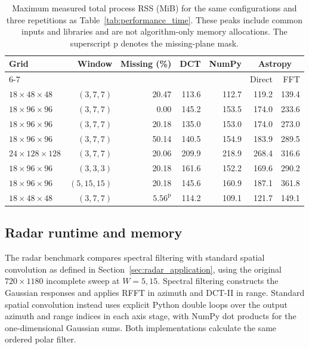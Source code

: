 \documentclass[a4paper,fleqn]{cas-sc}
\begin{document}
\begin{table}[pos=htbp]
	\centering
	\caption{Maximum measured total process RSS (MiB) for the same configurations and three repetitions as Table~\ref{tab:performance_time}. These peaks include common inputs and libraries and are not algorithm-only memory allocations. The superscript p denotes the missing-plane mask.}
	\label{tab:performance_ram}
	\setlength{\tabcolsep}{4pt}
	\begin{tabular*}{\linewidth}{@{\extracolsep{\fill}}lrrrrrr@{}}
		\toprule
		Grid & Window & Missing (\%) & DCT & NumPy & \multicolumn{2}{c}{Astropy} \\
		\cmidrule(l){6-7}
		 & & & & & Direct & FFT \\
		\midrule
		$18\times48\times48$ & $(3,7,7)$ & 20.47 & 113.6 & 112.7 & 119.2 & 139.4 \\
		$18\times96\times96$ & $(3,7,7)$ & 0.00 & 145.2 & 153.5 & 174.0 & 233.6 \\
		$18\times96\times96$ & $(3,7,7)$ & 20.18 & 135.0 & 153.0 & 174.0 & 273.0 \\
		$18\times96\times96$ & $(3,7,7)$ & 50.14 & 140.5 & 154.9 & 183.9 & 289.5 \\
		$24\times128\times128$ & $(3,7,7)$ & 20.06 & 209.9 & 218.9 & 268.4 & 316.6 \\
		$18\times96\times96$ & $(3,3,3)$ & 20.18 & 161.6 & 152.2 & 169.6 & 290.2 \\
		$18\times96\times96$ & $(5,15,15)$ & 20.18 & 145.6 & 160.9 & 187.1 & 361.8 \\
		$18\times48\times48$ & $(3,7,7)$ & $5.56^{\mathrm{p}}$ & 114.2 & 109.1 & 121.7 & 149.1 \\
		\bottomrule
	\end{tabular*}
\end{table}

\FloatBarrier
\subsection{Radar runtime and memory}
\label{sec:radar_performance}

The radar benchmark compares spectral filtering with standard spatial convolution as defined in Section~\ref{sec:radar_application}, using the original $720\times1180$ incomplete sweep at $W=5,15$. Spectral filtering constructs the Gaussian responses and applies RFFT in azimuth and DCT-II in range. Standard spatial convolution instead uses explicit Python double loops over the output azimuth and range indices in each axis stage, with NumPy dot products for the one-dimensional Gaussian sums. Both implementations calculate the same ordered polar filter.
\end{document}
